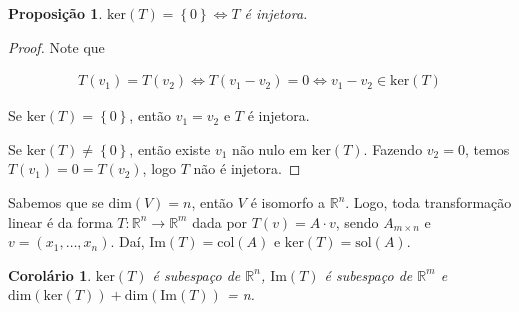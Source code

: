 \documentclass{article}
\newtheorem{corollary}{Corolário}[theorem]
\newtheorem*{proposition}{Proposição}
\begin{document}
\begin{proposition}
	$\text{ker}(T) = \left\{0\right\} \Leftrightarrow T$ é injetora.
\end{proposition}

\begin{proof}
	Note que
	
	\begin{align*}
	T(v_1) = T(v_2) \Leftrightarrow T(v_1 - v_2) = 0 \Leftrightarrow v_1-v_2\in\text{ker}(T)
	\end{align*}
	
	\par\vspace{0.3cm} Se $\text{ker}(T) = \left\{0\right\}$, então $v_1 = v_2$ e $T$ é injetora.
	
	\par\vspace{0.3cm} Se $\text{ker}(T)\neq\left\{0\right\}$, então existe $v_1$ não nulo em $\text{ker}(T)$. Fazendo $v_2 = 0$, temos $T(v_1) = 0 = T(v_2)$, logo $T$ não é injetora.
	
\end{proof}

\par\vspace{0.3cm} Sabemos que se $\text{dim}(V) = n$, então $V$ é isomorfo a $\mathbb{R}^n$. Logo, toda transformação linear é da forma $T:\mathbb{R}^n\to\mathbb{R}^m$ dada por $T(v) = A\cdot v$, sendo $A_{m\times n}$ e $v = (x_1, \dots, x_n)$. Daí, $\text{Im}(T) = \text{col}(A)$ e $\text{ker}(T) = \text{sol}(A)$.

\begin{corollary}
	$\text{ker}(T)$ é subespaço de $\mathbb{R}^n$, $\text{Im}(T)$ é subespaço de $\mathbb{R}^m$ e $\text{dim}(\text{ker}(T)) + \text{dim}(\text{Im}(T))$ = n.
\end{corollary}
\end{document}
